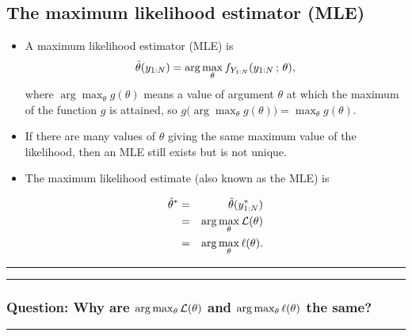 \documentclass[]{article}
\begin{document}
\subsection{The maximum likelihood estimator
(MLE)}\label{the-maximum-likelihood-estimator-mle}

\begin{itemize}
\item
  A maximum likelihood estimator (MLE) is
  \[ \hat\theta(y_{1:N}) = \arg\max_\theta f_{Y_{1:N}}(y_{1:N}\, ; \,\theta),\]
  where \(\arg\max_\theta g(\theta)\) means a value of argument
  \(\theta\) at which the maximum of the function \(g\) is attained, so
  \(g\big(\arg\max_\theta g(\theta)\big) = \max_\theta g(\theta)\).
\item
  If there are many values of \(\theta\) giving the same maximum value
  of the likelihood, then an MLE still exists but is not unique.
\item
  The maximum likelihood estimate (also known as the MLE) is

  \begin{eqnarray} \hat\theta^* &=& \hat\theta(y_{1:N}^*)
  \\
  &=& \arg\max_\theta \mathcal{L}(\theta)
  \\
  &=& \arg\max_\theta \ell(\theta).
  \end{eqnarray}
\end{itemize}

\begin{center}\rule{0.5\linewidth}{\linethickness}\end{center}

\begin{center}\rule{0.5\linewidth}{\linethickness}\end{center}

\subsubsection{\texorpdfstring{Question: Why are
\(\arg\max_\theta \mathcal{L}(\theta)\) and \(\arg\max_\theta \ell(\theta)\)
the
same?}{Question: Why are \textbackslash{}arg\textbackslash{}max\_\textbackslash{}theta \textbackslash{}lik(\textbackslash{}theta) and \textbackslash{}arg\textbackslash{}max\_\textbackslash{}theta \textbackslash{}loglik(\textbackslash{}theta) the same?}}\label{question-why-are-argmax_theta-liktheta-and-argmax_theta-logliktheta-the-same}

\begin{center}\rule{0.5\linewidth}{\linethickness}\end{center}
\end{document}
